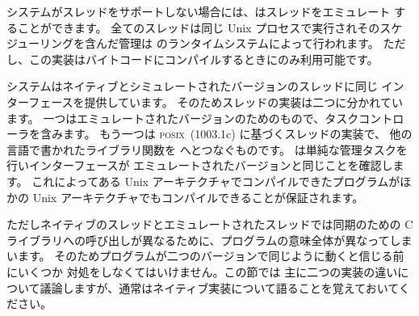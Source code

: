 システムがスレッドをサポートしない場合には、\ocaml はスレッドをエミュレート
することができます。
全てのスレッドは同じ Unix プロセスで実行されそのスケジューリングを含んだ管理は
\ocaml のランタイムシステムによって行われます。
ただし、この実装はバイトコードにコンパイルするときにのみ利用可能です。

\ocaml システムはネイティブとシミュレートされたバージョンのスレッドに同じ
インターフェースを提供しています。
そのためスレッドの実装は二つに分かれています。
一つはエミュレートされたバージョンのためのもので、タスクコントローラを含みます。
もう一つは \textsc{posix}~(1003.1c) に基づくスレッドの実装で、
他の言語で書かれたライブラリ関数を \ocaml へとつなぐものです。
\ocaml は単純な管理タスクを行いインターフェースが
エミュレートされたバージョンと同じことを確認します。
これによってある Unix アーキテクチャでコンパイルできたプログラムがほかの
Unix アーキテクチャでもコンパイルできることが保証されます。

ただしネイティブのスレッドとエミュレートされたスレッドでは同期のための
C ライブラリへの呼び出しが異なるために、プログラムの意味全体が異なってしまいます。
そのためプログラムが二つのバージョンで同じように動くと信じる前にいくつか
対処をしなくてはいけません。この節では
主に二つの実装の違いについて議論しますが、通常はネイティブ実装について語ることを覚えておいてください。

